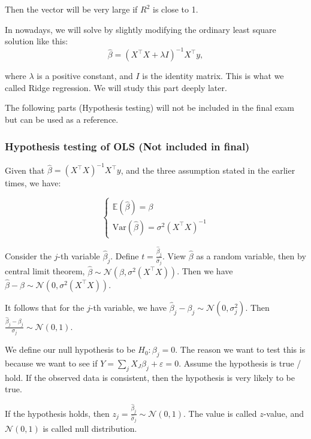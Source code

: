\documentclass{article}
\theoremstyle{MyNonumberplain}
\theoremstyle{break}
\newcommand{\ve}{\varepsilon}
\newcommand{\ev}{\mathbb{E}}
\newcommand{\var}{\text{Var}}
\newcommand{\T}{^\intercal}
\newcommand{\inv}{^{-1}}
\theoremstyle{break}
\theoremstyle{break}
\theoremstyle{break}
\begin{document}
Then the vector will be very large if $R^2$ is close to 1.

In nowadays, we will solve by slightly modifying the ordinary least square solution like this:
$$
\hat\beta=(X\T X+\lambda I)\inv X\T y,
$$

where $\lambda$ is a positive constant, and $I$ is the identity matrix. This is what we called Ridge regression. We will study this part deeply later.

The following parts (Hypothesis testing) will not be included in the final exam but can be used as a reference.

\subsubsection{Hypothesis testing of OLS (Not included in final)}

Given that $\hat\beta=(X\T X)\inv X\T y$, and the three assumption stated in the earlier times, we have:

$$
\begin{cases}
\ev(\hat\beta)=\beta \\
\var(\hat\beta)=\sigma^2(X\T X)\inv
\end{cases}
$$

Consider the $j$-th variable $\hat\beta_j$. Define $t=\frac{\hat\beta_j}{\hat\sigma_j}$.
View $\hat\beta$ as a random variable, then by central limit theorem, $\hat\beta\sim \mathcal{N}(\beta,\sigma^2(X\T X))$. Then we have $\hat\beta-\beta\sim\mathcal{N}(0,\sigma^2(X\T X))$.

It follows that for the $j$-th variable, we have $\hat\beta_j-\beta_j\sim\mathcal{N}(0,\sigma^2_j)$. Then $\frac{\hat\beta_j-\beta_j}{\sigma_j}\sim\mathcal{N}(0,1)$.

We define our null hypothesis to be $H_0:\beta_j=0$. 
The reason we want to test this is because we want to see if $Y=\sum_jX_J\beta_j+\ve=0$.
Assume the hypothesis is true / hold. If the observed data is consistent, then the hypothesis is very likely to be true. 

If the hypothesis holds, then $z_j=\frac{\hat\beta_j}{\hat\sigma_j}\sim \mathcal{N}(0,1)$. The value is called $z$-value, and $\mathcal{N}(0,1)$ is called null distribution.
\end{document}
